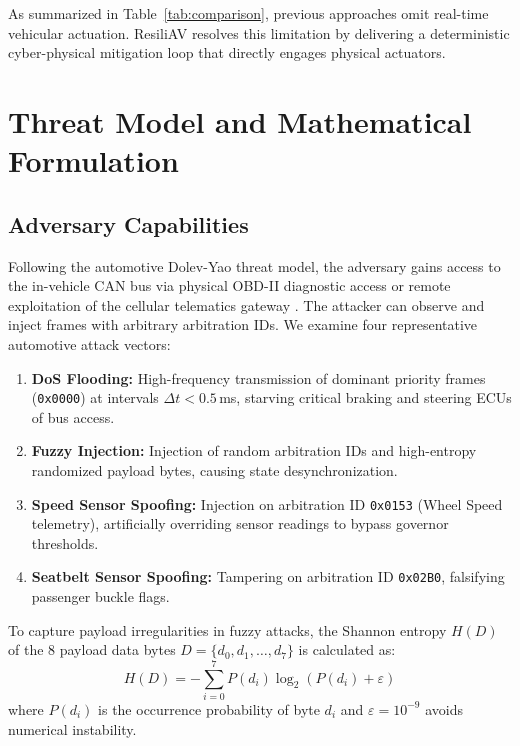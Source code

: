 \documentclass[conference]{IEEEtran}
\begin{document}
As summarized in Table~\ref{tab:comparison}, previous approaches omit real-time vehicular actuation. ResiliAV resolves this limitation by delivering a deterministic cyber-physical mitigation loop that directly engages physical actuators.

\section{Threat Model and Mathematical Formulation}

\subsection{Adversary Capabilities}
Following the automotive Dolev-Yao threat model, the adversary gains access to the in-vehicle CAN bus via physical OBD-II diagnostic access or remote exploitation of the cellular telematics gateway \cite{miller2015remote}. The attacker can observe and inject frames with arbitrary arbitration IDs. We examine four representative automotive attack vectors:
\begin{enumerate}
    \item \textbf{DoS Flooding:} High-frequency transmission of dominant priority frames (\texttt{0x0000}) at intervals $\Delta t < 0.5$\,ms, starving critical braking and steering ECUs of bus access.
    \item \textbf{Fuzzy Injection:} Injection of random arbitration IDs and high-entropy randomized payload bytes, causing state desynchronization.
    \item \textbf{Speed Sensor Spoofing:} Injection on arbitration ID \texttt{0x0153} (Wheel Speed telemetry), artificially overriding sensor readings to bypass governor thresholds.
    \item \textbf{Seatbelt Sensor Spoofing:} Tampering on arbitration ID \texttt{0x02B0}, falsifying passenger buckle flags.
\end{enumerate}

To capture payload irregularities in fuzzy attacks, the Shannon entropy $H(D)$ of the 8 payload data bytes $D = \{d_0, d_1, \dots, d_7\}$ is calculated as:
\begin{equation}
H(D) = -\sum_{i=0}^{7} P(d_i) \log_2(P(d_i) + \varepsilon)
\label{eq:entropy}
\end{equation}
where $P(d_i)$ is the occurrence probability of byte $d_i$ and $\varepsilon = 10^{-9}$ avoids numerical instability.
\end{document}

